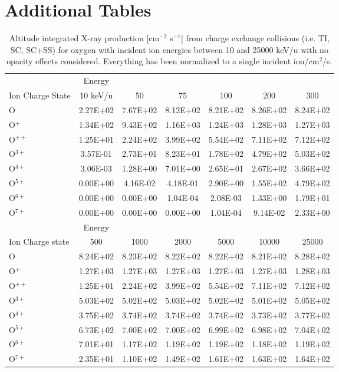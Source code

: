 \section{Additional Tables}

\begin{table}[h]
    \centering
    \begin{tabular}{l|c|c|c|c|c|c}
    \hline
    & Energy & & & & & \\
    Ion Charge State & 10 keV/u & 50 & 75 & 100 & 200 & 300 \\
    \hline
    O & 2.27E+02 & 7.67E+02 & 8.12E+02 & 8.21E+02 & 8.26E+02 & 8.24E+02 \\
    O$^+$ & 1.34E+02 & 9.43E+02 & 1.16E+03 & 1.24E+03 & 1.28E+03 & 1.27E+03 \\
    O$^{++}$ & 1.25E+01 & 2.24E+02 & 3.99E+02 & 5.54E+02 & 7.11E+02 & 7.12E+02 \\
    O$^{3+}$ & 3.57E-01 & 2.73E+01 & 8.23E+01 & 1.78E+02 & 4.79E+02 & 5.03E+02 \\
    O$^{4+}$ & 3.06E-03 & 1.28E+00 & 7.01E+00 & 2.65E+01 & 2.67E+02 & 3.66E+02 \\
    O$^{5+}$ & 0.00E+00 & 4.16E-02 & 4.18E-01 & 2.90E+00 & 1.55E+02 & 4.79E+02 \\
    O$^{6+}$ & 0.00E+00 & 0.00E+00 & 1.04E-04 & 2.08E-03 & 1.33E+00 & 1.79E+01 \\
    O$^{7+}$ & 0.00E+00 & 0.00E+00 & 0.00E+00 & 1.04E-04 & 9.14E-02 & 2.33E+00 \\
    \hline
    \hline
    & Energy & & & & & \\
    Ion Charge state & 500 & 1000 & 2000 & 5000 & 10000 & 25000 \\
    \hline
    O & 8.24E+02 & 8.23E+02 & 8.22E+02 & 8.22E+02 & 8.21E+02 & 8.28E+02 \\
    O$^+$ & 1.27E+03 & 1.27E+03 & 1.27E+03 & 1.27E+03 & 1.27E+03 & 1.28E+03 \\
    O$^{++}$ & 1.25E+01 & 2.24E+02 & 3.99E+02 & 5.54E+02 & 7.11E+02 & 7.12E+02 \\
    O$^{3+}$ & 5.03E+02 & 5.02E+02 & 5.03E+02 & 5.02E+02 & 5.01E+02 & 5.05E+02 \\
    O$^{4+}$ & 3.75E+02 & 3.74E+02 & 3.74E+02 & 3.74E+02 & 3.73E+02 & 3.77E+02 \\
    O$^{5+}$ & 6.73E+02 & 7.00E+02 & 7.00E+02 & 6.99E+02 & 6.98E+02 & 7.04E+02 \\
    O$^{6+}$ & 7.01E+01 & 1.17E+02 & 1.19E+02 & 1.19E+02 & 1.18E+02 & 1.19E+02 \\
    O$^{7+}$ & 2.35E+01 & 1.10E+02 & 1.49E+02 & 1.61E+02 & 1.63E+02 & 1.64E+02 \\
    \hline
    \end{tabular}
    \caption{Altitude integrated X-ray production [cm$^{-2}$ s$^{-1}$] from charge exchange collisions (i.e. TI, SC, SC+SS) for oxygen with incident ion energies between 10 and 25000 keV/u with no opacity effects considered. Everything has been normalized to a single incident ion/cm$^2$/s.}
    \label{tab:my_label}
\end{table}

